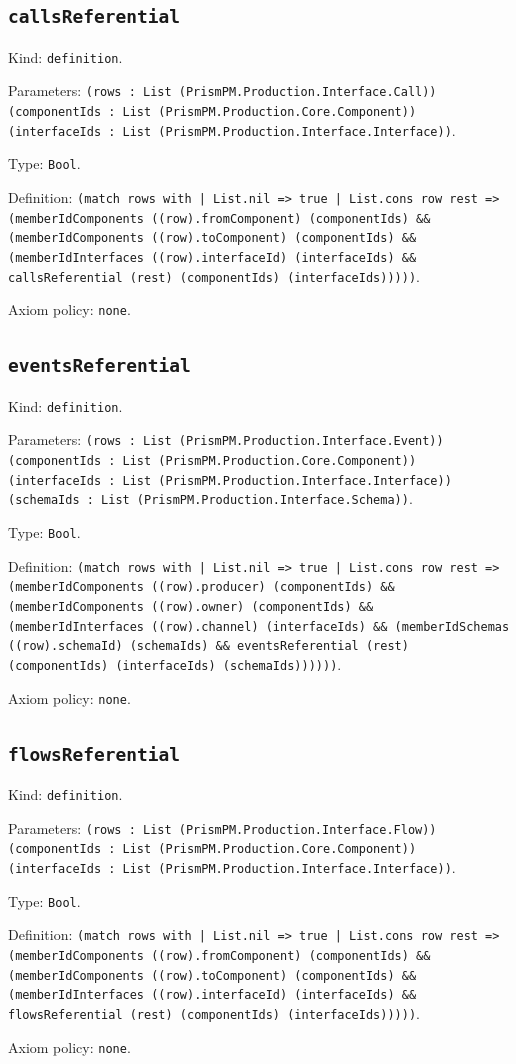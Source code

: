 \documentclass[11pt]{article}
\begin{document}
\subsection*{\texttt{callsReferential}}
\noindent Kind: \texttt{definition}.\par
\noindent Parameters: \texttt{(rows : List (PrismPM.Production.Interface.Call)) (componentIds : List (PrismPM.Production.Core.Component)) (interfaceIds : List (PrismPM.Production.Interface.Interface))}.\par
\noindent Type: \texttt{Bool}.\par
\noindent Definition: \texttt{(match rows with | List.nil => true | List.cons row rest => (memberIdComponents ((row).fromComponent) (componentIds) \&\& (memberIdComponents ((row).toComponent) (componentIds) \&\& (memberIdInterfaces ((row).interfaceId) (interfaceIds) \&\& callsReferential (rest) (componentIds) (interfaceIds)))))}.\par
\noindent Axiom policy: \texttt{none}.\par
\subsection*{\texttt{eventsReferential}}
\noindent Kind: \texttt{definition}.\par
\noindent Parameters: \texttt{(rows : List (PrismPM.Production.Interface.Event)) (componentIds : List (PrismPM.Production.Core.Component)) (interfaceIds : List (PrismPM.Production.Interface.Interface)) (schemaIds : List (PrismPM.Production.Interface.Schema))}.\par
\noindent Type: \texttt{Bool}.\par
\noindent Definition: \texttt{(match rows with | List.nil => true | List.cons row rest => (memberIdComponents ((row).producer) (componentIds) \&\& (memberIdComponents ((row).owner) (componentIds) \&\& (memberIdInterfaces ((row).channel) (interfaceIds) \&\& (memberIdSchemas ((row).schemaId) (schemaIds) \&\& eventsReferential (rest) (componentIds) (interfaceIds) (schemaIds))))))}.\par
\noindent Axiom policy: \texttt{none}.\par
\subsection*{\texttt{flowsReferential}}
\noindent Kind: \texttt{definition}.\par
\noindent Parameters: \texttt{(rows : List (PrismPM.Production.Interface.Flow)) (componentIds : List (PrismPM.Production.Core.Component)) (interfaceIds : List (PrismPM.Production.Interface.Interface))}.\par
\noindent Type: \texttt{Bool}.\par
\noindent Definition: \texttt{(match rows with | List.nil => true | List.cons row rest => (memberIdComponents ((row).fromComponent) (componentIds) \&\& (memberIdComponents ((row).toComponent) (componentIds) \&\& (memberIdInterfaces ((row).interfaceId) (interfaceIds) \&\& flowsReferential (rest) (componentIds) (interfaceIds)))))}.\par
\noindent Axiom policy: \texttt{none}.\par
\end{document}
